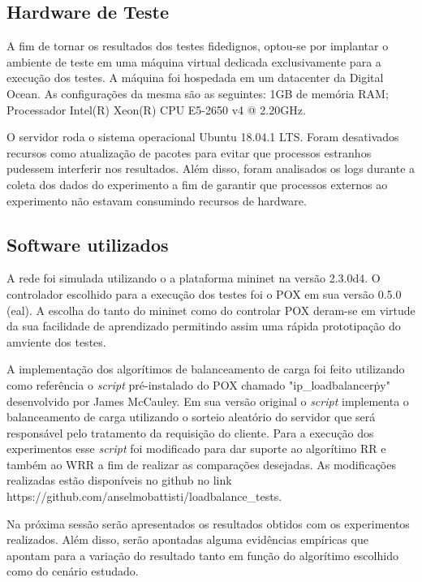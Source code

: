 \documentclass[12pt]{article}
\begin{document}
\subsection{Hardware de Teste}

A fim de tornar os resultados dos testes fidedignos, optou-se por implantar o ambiente de teste em uma máquina virtual dedicada exclusivamente para a execução dos testes. A máquina foi hospedada em um datacenter da Digital Ocean. As configurações da mesma são as seguintes: 1GB de memória RAM; Processador Intel(R) Xeon(R) CPU E5-2650 v4 @ 2.20GHz.

O servidor roda o sistema operacional Ubuntu 18.04.1 LTS. Foram desativados recursos como atualização de pacotes para evitar que processos estranhos pudessem interferir nos resultados. Além disso, foram analisados os logs durante a coleta dos dados do experimento a fim de garantir que processos externos ao experimento não estavam consumindo recursos de hardware.

\subsection{Software utilizados}

A rede foi simulada utilizando o a plataforma mininet na versão 2.3.0d4. O controlador escolhido para a execução dos testes foi o POX em sua versão 0.5.0 (eal). A escolha do tanto do mininet como do controlar POX deram-se em virtude da sua facilidade de aprendizado permitindo assim uma rápida prototipação do amviente dos testes.

A implementação dos algorítimos de balanceamento de carga foi feito utilizando como referência o \textit{script} pré-instalado do POX chamado "ip\_loadbalancer\.py" desenvolvido por James McCauley. Em sua versão original o \textit{script} implementa o balanceamento de carga utilizando o sorteio aleatório do servidor que será responsável pelo tratamento da requisição do cliente. Para a execução dos experimentos esse \textit{script} foi modificado para dar suporte ao algorítimo RR e também ao WRR a fim de realizar as comparações desejadas. As modificações realizadas estão disponíveis no github no link https://github.com/anselmobattisti/loadbalance\_tests.

Na próxima sessão serão apresentados os resultados obtidos com os experimentos realizados. Além disso, serão apontadas alguma evidências empíricas que apontam para a variação do resultado tanto em função do algorítimo escolhido como do cenário estudado. 
\end{document}
